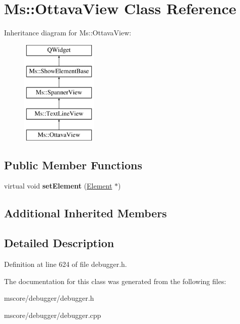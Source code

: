 \hypertarget{class_ms_1_1_ottava_view}{}\section{Ms\+:\+:Ottava\+View Class Reference}
\label{class_ms_1_1_ottava_view}
Inheritance diagram for Ms\+:\+:Ottava\+View\+:\begin{figure}[H]
\begin{center}
\leavevmode
\includegraphics[height=5.000000cm]{class_ms_1_1_ottava_view}
\end{center}
\end{figure}
\subsection*{Public Member Functions}
\begin{DoxyCompactItemize}
\item 
\mbox{\label{class_ms_1_1_ottava_view_a7d2ff21fe36ab940ec965848f67cc4a9}} 
virtual void {\bfseries set\+Element} (\hyperlink{class_ms_1_1_element}{Element} $\ast$)
\end{DoxyCompactItemize}
\subsection*{Additional Inherited Members}


\subsection{Detailed Description}


Definition at line 624 of file debugger.\+h.



The documentation for this class was generated from the following files\+:\begin{DoxyCompactItemize}
\item 
mscore/debugger/debugger.\+h\item 
mscore/debugger/debugger.\+cpp\end{DoxyCompactItemize}
